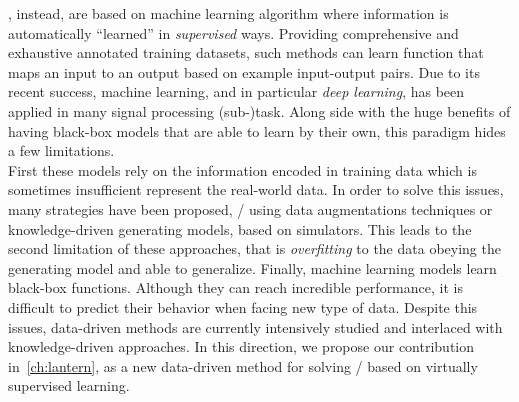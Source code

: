 , instead, are based on machine learning algorithm where information is automatically ``learned'' in \textit{supervised} ways.
Providing comprehensive and exhaustive annotated training datasets, such methods can learn function that maps an input to an output based on example input-output pairs.
Due to its recent success, machine learning, and in particular \textit{deep learning}, has been applied in many signal processing (sub-)task.
Along side with the huge benefits of having black-box models that are able to learn by their own, this paradigm hides a few limitations.
\\First these models rely on the information encoded in training data which is sometimes insufficient represent the real-world data.
In order to solve this issues, many strategies have been proposed, \eg/ using data augmentations techniques or knowledge-driven generating models, based on simulators.
This leads to the second limitation of these approaches, that is \textit{overfitting} to the data obeying the generating model and able to generalize.
Finally, machine learning models learn black-box functions.
Although they can reach incredible performance, it is difficult to predict their behavior when facing new type of data.
Despite this issues, data-driven methods are currently intensively studied and interlaced with knowledge-driven approaches.
In this direction, we propose our contribution in~\cref{ch:lantern}, as a new data-driven method for solving \AER/ based on virtually supervised learning.